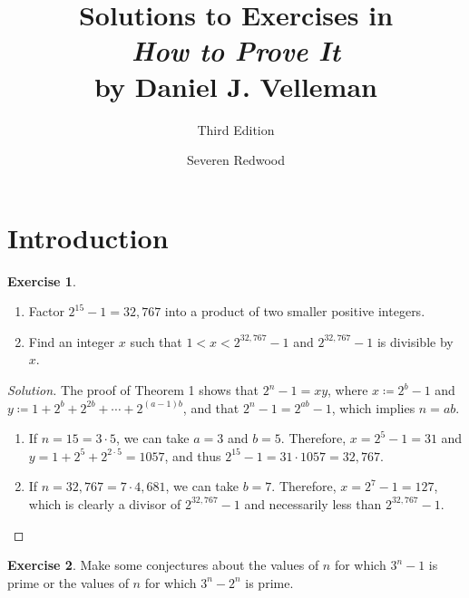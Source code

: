 \documentclass[headings=standardclasses]{scrartcl}
\title{Solutions to Exercises in\\ \emph{How to Prove It}\\ by Daniel J. Velleman}
\subtitle{Third Edition}
\author{Severen Redwood}
\date{}
\theoremstyle{definition}
\newtheorem{exercise}{Exercise}[subsection]
\newenvironment{solution}{\begin{proof}[Solution]}{\end{proof}}
\begin{document}
\maketitle

\tableofcontents

\section*{Introduction}

\begin{exercise}~ %
  \begin{enumerate}
    \item Factor \(2^{15} - 1 = 32,767\) into a product of two smaller positive
          integers.
    \item Find an integer \(x\) such that \(1 < x < 2^{32,767} - 1\) and
          \(2^{32,767} - 1\) is divisible by \(x\).
  \end{enumerate}
\end{exercise}

\begin{solution}
  The proof of Theorem 1 shows that \(2^n - 1 = xy\), where \(x ≔ 2^{b} - 1\)
  and \(y ≔ 1 + 2^b + 2^{2b} + ⋯ + 2^{(a - 1)b}\), and that \(2^{n} - 1 =
  2^{ab} - 1\), which implies \(n = ab\).

  \begin{enumerate}
    \item If \(n = 15 = 3 \cdot 5\), we can take \(a = 3\) and \(b = 5\).
          Therefore, \(x = 2^5 - 1 = 31\) and \(y = 1 + 2^5 + 2^{2 ⋅ 5} =
          1057\), and thus \(2^{15} - 1 = 31 ⋅ 1057 = 32,767\).
    \item If \(n = 32,767 = 7 \cdot 4,681\), we can take \(b = 7\). Therefore,
          \(x = 2^7 - 1 = 127\), which is clearly a divisor of \(2^{32,767} -
          1\) and necessarily less than \(2^{32,767} - 1\). \qedhere
  \end{enumerate}
\end{solution}

\begin{exercise}
  Make some conjectures about the values of \(n\) for which \(3^n − 1\) is
  prime or the values of \(n\) for which \(3^n − 2^n\) is prime.
\end{exercise}
\end{document}
